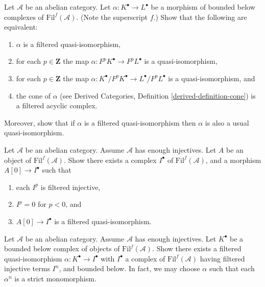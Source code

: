 \begin{exercise}
\label{exercise-filtered-quasi-isomorphism}
Let $\mathcal{A}$ be an abelian category.
Let $\alpha : K^\bullet \to L^\bullet$ be a morphism of bounded below
complexes of $\text{Fil}^f(\mathcal{A})$. (Note the superscript $f$.)
Show that the following are equivalent:
\begin{enumerate}
\item $\alpha$ is a filtered quasi-isomorphism,
\item for each $p \in \mathbf{Z}$ the map
$\alpha : F^pK^\bullet \to F^pL^\bullet$ is a quasi-isomorphism,
\item for each $p \in \mathbf{Z}$ the map
$\alpha : K^\bullet/F^pK^\bullet \to L^\bullet/F^pL^\bullet$
is a quasi-isomorphism, and
\item the cone of $\alpha$ (see
Derived Categories, Definition \ref{derived-definition-cone})
is a filtered acyclic complex.
\end{enumerate}
Moreover, show that if $\alpha$ is a filtered quasi-isomorphism
then $\alpha$ is also a usual quasi-isomorphism.
\end{exercise}

\begin{exercise}
\label{exercise-injective-resolution}
Let $\mathcal{A}$ be an abelian category.
Assume $\mathcal{A}$ has enough injectives.
Let $A$ be an object of $\text{Fil}^f(\mathcal{A})$.
Show there exists a complex
$I^\bullet$ of $\text{Fil}^f(\mathcal{A})$,
and a morphism $A[0] \to I^\bullet$ such that
\begin{enumerate}
\item each $I^p$ is filtered injective,
\item $I^p = 0$ for $p < 0$, and
\item $A[0] \to I^\bullet$ is a filtered quasi-isomorphism.
\end{enumerate}
\end{exercise}

\begin{exercise}
\label{exercise-injective-resolution-complex}
Let $\mathcal{A}$ be an abelian category.
Assume $\mathcal{A}$ has enough injectives.
Let $K^\bullet$ be a bounded below complex of objects of
$\text{Fil}^f(\mathcal{A})$. Show there exists a
filtered quasi-isomorphism $\alpha : K^\bullet \to I^\bullet$
with $I^\bullet$ a complex of $\text{Fil}^f(\mathcal{A})$
having filtered injective terms $I^n$, and bounded below.
In fact, we may choose $\alpha$ such that each $\alpha^n$ is
a strict monomorphism.
\end{exercise}

